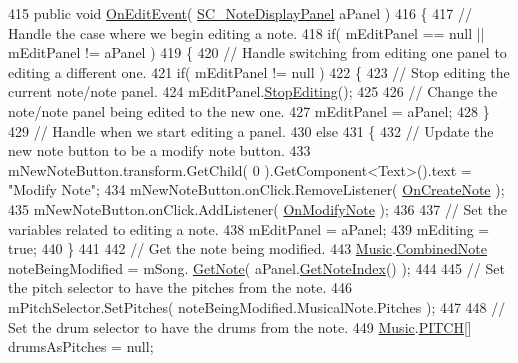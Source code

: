 \begin{DoxyCodeInclude}
415     \textcolor{keyword}{public} \textcolor{keywordtype}{void} \hyperlink{group___s_c_m_handlers_gacb552a4f02b22d7c10a8420eb1431201}{OnEditEvent}( \hyperlink{class_s_c___note_display_panel}{SC\_NoteDisplayPanel} aPanel )
416     \{
417         \textcolor{comment}{// Handle the case where we begin editing a note.}
418         \textcolor{keywordflow}{if}( mEditPanel == null || mEditPanel != aPanel )
419         \{
420             \textcolor{comment}{// Handle switching from editing one panel to editing a different one.}
421             \textcolor{keywordflow}{if}( mEditPanel != null )
422             \{
423                 \textcolor{comment}{// Stop editing the current note/note panel.}
424                 mEditPanel.\hyperlink{group___s_c___n_d_p_unity_ga92d0f078c4efd6c207173a10e31b5065}{StopEditing}();
425 
426                 \textcolor{comment}{// Change the note/note panel being edited to the new one.}
427                 mEditPanel = aPanel;
428             \}
429             \textcolor{comment}{// Handle when we start editing a panel.}
430             \textcolor{keywordflow}{else}
431             \{
432                 \textcolor{comment}{// Update the new note button to be a modify note button.}
433                 mNewNoteButton.transform.GetChild( 0 ).GetComponent<Text>().text = \textcolor{stringliteral}{"Modify Note"};
434                 mNewNoteButton.onClick.RemoveListener( \hyperlink{group___s_c_m_handlers_gaed512eb78e060a40616e6e31ce029440}{OnCreateNote} );
435                 mNewNoteButton.onClick.AddListener( \hyperlink{group___s_c_m_handlers_gaf12d6326ad2175a51f688504372be784}{OnModifyNote} );
436 
437                 \textcolor{comment}{// Set the variables related to editing a note.}
438                 mEditPanel = aPanel;
439                 mEditing = \textcolor{keyword}{true};
440             \}
441 
442             \textcolor{comment}{// Get the note being modified.}
443             \hyperlink{class_music}{Music}.\hyperlink{group___music_structs_struct_music_1_1_combined_note}{CombinedNote} noteBeingModified = mSong.
      \hyperlink{group___song_pub_func_ga485c83c9278103fed23c532bba1252f0}{GetNote}( aPanel.\hyperlink{group___s_c___n_d_p_unity_ga8beef050026ade4ba4ccb574c414d24e}{GetNoteIndex}() );
444 
445             \textcolor{comment}{// Set the pitch selector to have the pitches from the note.}
446             mPitchSelector.SetPitches( noteBeingModified.MusicalNote.Pitches );
447 
448             \textcolor{comment}{// Set the drum selector to have the drums from the note.}
449             \hyperlink{class_music}{Music}.\hyperlink{group___music_enums_ga508f69b199ea518f935486c990edac1d}{PITCH}[] drumsAsPitches = null;

\end{DoxyCodeInclude}

